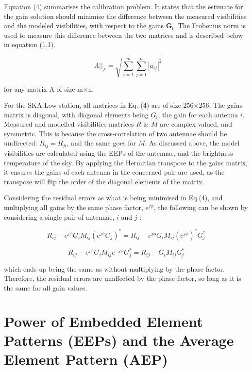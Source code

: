 \documentclass[12pt]{report} %
\begin{document}
Equation (4) summarises the calibration problem. It states that the estimate for the gain solution should minimise the difference between the measured visibilities and the modeled visibilities, with respect to the gains $\mathbf{G_{i}}$. The Frobenius norm is used to measure this difference between the two matrices and is described below in equation (1.1)\cite{frobenius}.

\begin{equation}
    ||A||_{F} = \sqrt{\sum_{i=1}^{m} \sum_{j=1}^{n} |a_{ij}|^{2}}
\end{equation}

for any matrix A of size m$\times$n.


For the SKA-Low station, all matrices in Eq. (4) are of size 256$\times$256\cite{borg2020on-sky}. The gains matrix is diagonal, with diagonal elements being $G_{i}$, the gain for each antenna $i$\cite{smirnov2011revisiting}. Measured and modelled visibilities matrices $R$ \& $M$ are complex valued, and symmetric. This is because the cross-correlation of two antennae should be undirected: $R_{ij} = R_{ji}$, and the same goes for $M$. As discussed above, the model visibilities are calculated using the EEPs of the antennae, and the brightness temperature of the sky. By applying the Hermitian transpose to the gains matrix, it ensures the gains of each antenna in the concerned pair are used, as the transpose will flip the order of the diagonal elements of the matrix.


Considering the residual errors as what is being minimised in Eq.(4), and multiplying all gains by the same phase factor, $e^{j\phi}$, the following can be shown by considering a single pair of antennae, $i$ and $j$ \cite{complex_conjugates}:

\begin{equation}
  R_{ij} - e^{j\phi}G_{i}M_{ij}(e^{j\phi}G_{j})^{*} = R_{ij} -  e^{j\phi}G_{i}M_{ij}(e^{j\phi})^{*}G_{j}^{*}
\end{equation}

\begin{equation}
  R_{ij} -  e^{j\phi}G_{i}M_{ij}e^{-j\phi}G_{j}^{*} = R_{ij} -  G_{i}M_{ij}G_{j}^{*}
\end{equation}

which ends up being the same as without multiplying by the phase factor. Therefore, the residual errors are unaffected by the phase factor, so long as it is the same for all gain values.

\section{Power of Embedded Element Patterns (EEPs) and the Average Element Pattern (AEP)}
\end{document}
